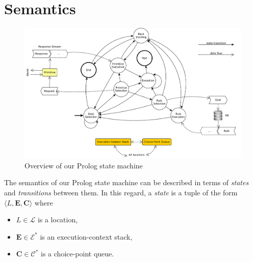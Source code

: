 \documentclass{article}
\newcommand{\vect}[1]{\mathbf{#1}}
\newcommand{\notableset}[1]{\mathcal{#1}}
\begin{document}
\section{Semantics}

\begin{figure}
    \centering
    \includegraphics[width=\linewidth]{img/classic-sm.pdf}
    \caption{Overview of our Prolog state machine}
    \label{fig:prolog-fsa}
\end{figure}

The semantics of our Prolog state machine can be described in terms of \emph{states} and \emph{transitions} between them.
%
In this regard, a \emph{state} is a tuple of the form $\langle L, \vect{E}, \vect{C} \rangle$ where
%
\begin{itemize}
    \item $L \in \notableset{L}$ is a location,
    \item $\vect{E} \in \notableset{E}^*$ is an execution-context stack,
    \item $\vect{C} \in \notableset{C}^*$ is a choice-point queue.
\end{itemize}
\end{document}

